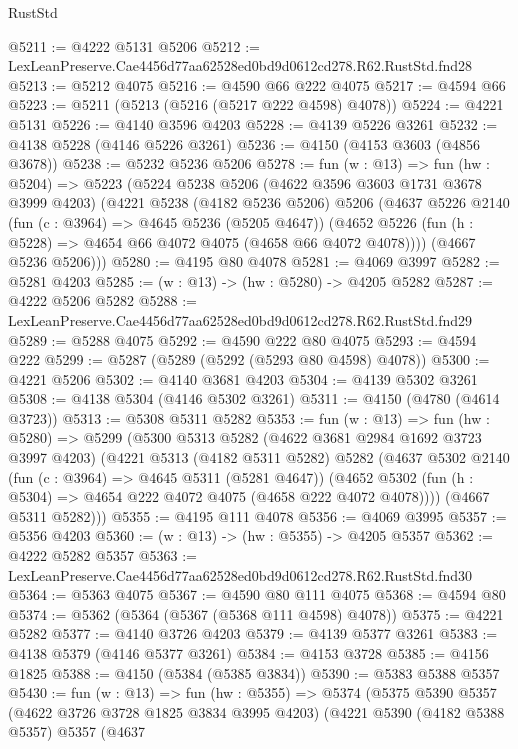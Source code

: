 \begin{lexlean}{RustStd}
\begin{coremodule}
@5211 := @4222 @5131 @5206
@5212 := LexLeanPreserve.Cae4456d77aa62528ed0bd9d0612cd278.R62.RustStd.fnd28
@5213 := @5212 @4075
@5216 := @4590 @66 @222 @4075
@5217 := @4594 @66
@5223 := @5211 (@5213 (@5216 (@5217 @222 @4598) @4078))
@5224 := @4221 @5131
@5226 := @4140 @3596 @4203
@5228 := @4139 @5226 @3261
@5232 := @4138 @5228 (@4146 @5226 @3261)
@5236 := @4150 (@4153 @3603 (@4856 @3678))
@5238 := @5232 @5236 @5206
@5278 := fun (w : @13) =>
  fun (hw : @5204) =>
  @5223
    (@5224
      @5238
      @5206
      (@4622 @3596 @3603 @1731 @3678 @3999 @4203)
      (@4221
        @5238
        (@4182 @5236 @5206)
        @5206
        (@4637
          @5226
          @2140
          (fun (c : @3964) => @4645 @5236 (@5205 @4647))
          (@4652 @5226 (fun (h : @5228) => @4654 @66 @4072 @4075 (@4658 @66 @4072 @4078))))
        (@4667 @5236 @5206)))
@5280 := @4195 @80 @4078
@5281 := @4069 @3997
@5282 := @5281 @4203
@5285 := (w : @13) -> (hw : @5280) -> @4205 @5282
@5287 := @4222 @5206 @5282
@5288 := LexLeanPreserve.Cae4456d77aa62528ed0bd9d0612cd278.R62.RustStd.fnd29
@5289 := @5288 @4075
@5292 := @4590 @222 @80 @4075
@5293 := @4594 @222
@5299 := @5287 (@5289 (@5292 (@5293 @80 @4598) @4078))
@5300 := @4221 @5206
@5302 := @4140 @3681 @4203
@5304 := @4139 @5302 @3261
@5308 := @4138 @5304 (@4146 @5302 @3261)
@5311 := @4150 (@4780 (@4614 @3723))
@5313 := @5308 @5311 @5282
@5353 := fun (w : @13) =>
  fun (hw : @5280) =>
  @5299
    (@5300
      @5313
      @5282
      (@4622 @3681 @2984 @1692 @3723 @3997 @4203)
      (@4221
        @5313
        (@4182 @5311 @5282)
        @5282
        (@4637
          @5302
          @2140
          (fun (c : @3964) => @4645 @5311 (@5281 @4647))
          (@4652 @5302 (fun (h : @5304) => @4654 @222 @4072 @4075 (@4658 @222 @4072 @4078))))
        (@4667 @5311 @5282)))
@5355 := @4195 @111 @4078
@5356 := @4069 @3995
@5357 := @5356 @4203
@5360 := (w : @13) -> (hw : @5355) -> @4205 @5357
@5362 := @4222 @5282 @5357
@5363 := LexLeanPreserve.Cae4456d77aa62528ed0bd9d0612cd278.R62.RustStd.fnd30
@5364 := @5363 @4075
@5367 := @4590 @80 @111 @4075
@5368 := @4594 @80
@5374 := @5362 (@5364 (@5367 (@5368 @111 @4598) @4078))
@5375 := @4221 @5282
@5377 := @4140 @3726 @4203
@5379 := @4139 @5377 @3261
@5383 := @4138 @5379 (@4146 @5377 @3261)
@5384 := @4153 @3728
@5385 := @4156 @1825
@5388 := @4150 (@5384 (@5385 @3834))
@5390 := @5383 @5388 @5357
@5430 := fun (w : @13) =>
  fun (hw : @5355) =>
  @5374
    (@5375
      @5390
      @5357
      (@4622 @3726 @3728 @1825 @3834 @3995 @4203)
      (@4221
        @5390
        (@4182 @5388 @5357)
        @5357
        (@4637

\end{coremodule}
\end{lexlean}
